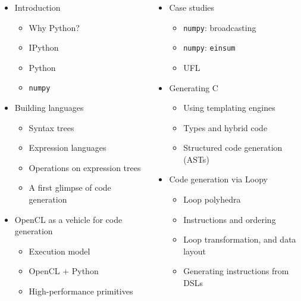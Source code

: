\documentclass[english,compress]{beamer}
\begin{document}
\begin{frame}
  \begin{columns}
    \begin{itemize}
    \setlength{\itemsep}{0.0in}
    \item Introduction
      \begin{itemize}
        \item Why Python?
        \item IPython
        \item Python
        \item \texttt{numpy}
      \end{itemize}
    \item Building languages
      \begin{itemize}
        \item Syntax trees
        \item Expression languages
        \item Operations on expression trees
        \item A first glimpse of code generation
      \end{itemize}
    \item OpenCL as a vehicle for code generation
      \begin{itemize}
        \item Execution model
        \item OpenCL + Python
        \item High-performance primitives
      \end{itemize}
    \end{itemize}

    \begin{itemize}
    \item Case studies
      \begin{itemize}
        \item \texttt{numpy}: broadcasting
        \item \texttt{numpy}: \texttt{einsum}
        \item UFL
      \end{itemize}
    \item Generating C
      \begin{itemize}
        \item Using templating engines
        \item Types and hybrid code
        \item Structured code generation (ASTs)
      \end{itemize}
    \item Code generation via Loopy
      \begin{itemize}
        \item Loop polyhedra
        \item Instructions and ordering
        \item Loop transformation, and data layout
        \item Generating instructions from DSLs
      \end{itemize}
    \end{itemize}
  \end{columns}
\end{frame}
\end{document}

